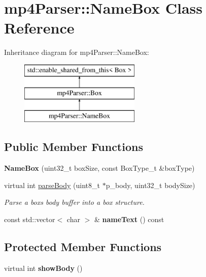 \hypertarget{classmp4_parser_1_1_name_box}{}\section{mp4\+Parser\+::Name\+Box Class Reference}
\label{classmp4_parser_1_1_name_box}
Inheritance diagram for mp4\+Parser\+::Name\+Box\+:\begin{figure}[H]
\begin{center}
\leavevmode
\includegraphics[height=3.000000cm]{classmp4_parser_1_1_name_box}
\end{center}
\end{figure}
\subsection*{Public Member Functions}
\begin{DoxyCompactItemize}
\item 
\mbox{\label{classmp4_parser_1_1_name_box_a57f52c2de8537cd3cacf4adf891ae88a}} 
{\bfseries Name\+Box} (uint32\+\_\+t box\+Size, const Box\+Type\+\_\+t \&box\+Type)
\item 
virtual int \mbox{\hyperlink{classmp4_parser_1_1_name_box_ae7f3b3a458b89f874f2f6584fd7e0123}{parse\+Body}} (uint8\+\_\+t $\ast$p\+\_\+body, uint32\+\_\+t body\+Size)
\begin{DoxyCompactList}\small\item\em Parse a box\textquotesingle{}s body buffer into a box structure. \end{DoxyCompactList}\item 
\mbox{\label{classmp4_parser_1_1_name_box_a0c681b3c69661f556e76eb0399a1f341}} 
const std\+::vector$<$ char $>$ \& {\bfseries name\+Text} () const
\end{DoxyCompactItemize}
\subsection*{Protected Member Functions}
\begin{DoxyCompactItemize}
\item 
\mbox{\label{classmp4_parser_1_1_name_box_a84436d5734d5fd396c549e6b0ef3d207}} 
virtual int {\bfseries show\+Body} ()
\end{DoxyCompactItemize}
